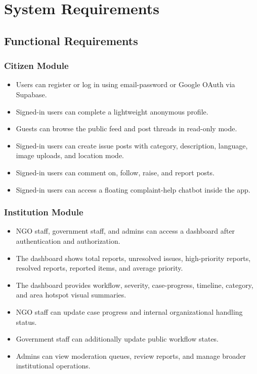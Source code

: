 \documentclass[12pt,a4paper]{report}
\begin{document}
\chapter{System Requirements}
\section{Functional Requirements}
\subsection{Citizen Module}
\begin{itemize}
  \item Users can register or log in using email-password or Google OAuth via Supabase.
  \item Signed-in users can complete a lightweight anonymous profile.
  \item Guests can browse the public feed and post threads in read-only mode.
  \item Signed-in users can create issue posts with category, description, language, image uploads, and location mode.
  \item Signed-in users can comment on, follow, raise, and report posts.
  \item Signed-in users can access a floating complaint-help chatbot inside the app.
\end{itemize}

\subsection{Institution Module}
\begin{itemize}
  \item NGO staff, government staff, and admins can access a dashboard after authentication and authorization.
  \item The dashboard shows total reports, unresolved issues, high-priority reports, resolved reports, reported items, and average priority.
  \item The dashboard provides workflow, severity, case-progress, timeline, category, and area hotspot visual summaries.
  \item NGO staff can update case progress and internal organizational handling status.
  \item Government staff can additionally update public workflow states.
  \item Admins can view moderation queues, review reports, and manage broader institutional operations.
\end{itemize}
\end{document}
